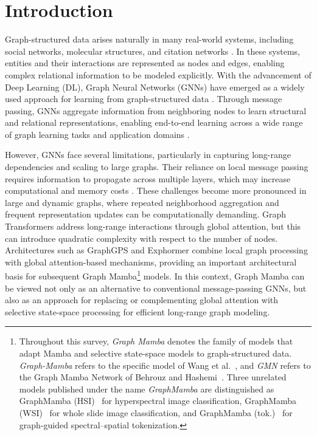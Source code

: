 \documentclass[acmsmall]{acmart}
\begin{document}
\section{Introduction}

Graph-structured data arises naturally in many real-world systems, including
social networks, molecular structures, and citation networks
\cite{xia2021graph,jiang2022graph,wang2024graph}.
In these systems, entities
and their interactions are represented as nodes and edges, enabling complex
relational information to be modeled explicitly. With the advancement of Deep
Learning (DL), Graph Neural Networks (GNNs) have emerged as a widely used
approach for learning from graph-structured data \cite{xia2021graph}. Through
message passing, GNNs aggregate information from neighboring nodes to learn
structural and relational representations, enabling end-to-end learning across
a wide range of graph learning tasks and application domains
\cite{wang2024graph}.

However, GNNs face several limitations, particularly in capturing long-range
dependencies and scaling to large graphs. Their reliance on local message
passing requires information to propagate across multiple layers, which may
increase computational and memory costs \cite{liu2024federated}.
These
challenges become more pronounced in large and dynamic graphs, where repeated
neighborhood aggregation and frequent representation updates can be
computationally demanding. Graph Transformers address long-range interactions
through global attention, but this can introduce quadratic complexity with
respect to the number of nodes. Architectures such as GraphGPS
\cite{rampavsek2022recipe} and Exphormer \cite{shirzad2023exphormer} combine
local graph processing with global attention-based mechanisms, providing an
important architectural basis for subsequent Graph Mamba\footnote{Throughout
this survey, \emph{Graph Mamba} denotes the family of models that adapt Mamba
and selective state-space models to graph-structured data. \emph{Graph-Mamba}
refers to the specific model of Wang et al.~\cite{wang2024graph}, and
\emph{GMN} refers to the Graph Mamba Network of Behrouz and
Hashemi~\cite{behrouz2024graph}. Three unrelated models published under the
name \emph{GraphMamba} are distinguished as GraphMamba
(HSI)~\cite{yang2024graphmamba} for hyperspectral image classification,
GraphMamba (WSI)~\cite{zheng2025graphmamba} for whole slide image
classification, and GraphMamba (tok.)~\cite{ahmad2025graphmamba} for
graph-guided spectral--spatial tokenization.} models. In this
context, Graph Mamba can be viewed not only as an alternative to conventional
message-passing GNNs, but also as an approach for replacing or complementing
global attention with selective state-space processing for efficient
long-range graph modeling.
\end{document}
